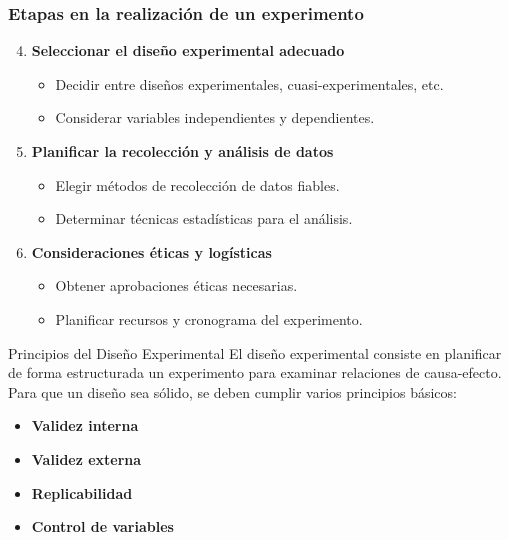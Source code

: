 ﻿\documentclass{beamer}
\begin{document}
\begin{frame}
\frametitle{Etapas en la realización de un experimento}
\begin{enumerate}
    \setcounter{enumi}{3}
    \item \textbf{Seleccionar el diseño experimental adecuado}
    \begin{itemize}
        \item Decidir entre diseños experimentales, cuasi-experimentales, etc.
        \item Considerar variables independientes y dependientes.
    \end{itemize}
    \vspace{0.3cm}
    \item \textbf{Planificar la recolección y análisis de datos}
    \begin{itemize}
        \item Elegir métodos de recolección de datos fiables.
        \item Determinar técnicas estadísticas para el análisis.
    \end{itemize}
    \vspace{0.3cm}
    \item \textbf{Consideraciones éticas y logísticas}
    \begin{itemize}
        \item Obtener aprobaciones éticas necesarias.
        \item Planificar recursos y cronograma del experimento.
    \end{itemize}
\end{enumerate}
\end{frame}

\begin{frame}{Principios del Diseño Experimental}
El diseño experimental consiste en planificar de forma estructurada un experimento para examinar relaciones de causa-efecto. Para que un diseño sea sólido, se deben cumplir varios principios básicos:
\begin{itemize}
    \item \textbf{Validez interna}
    \item \textbf{Validez externa}
    \item \textbf{Replicabilidad}
    \item \textbf{Control de variables}
\end{itemize}
\end{frame}
\end{document}
